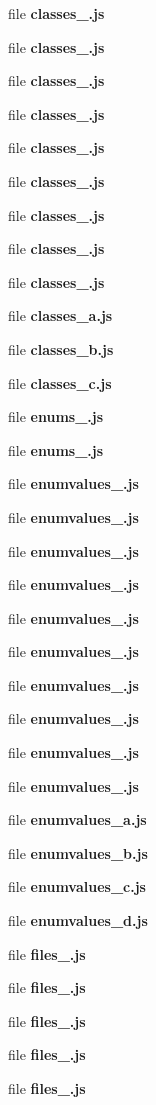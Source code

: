 \begin{DoxyCompactItemize}
file {\bf classes\-\_.\-js}
\item 
file {\bf classes\-\_.\-js}
\item 
file {\bf classes\-\_.\-js}
\item 
file {\bf classes\-\_.\-js}
\item 
file {\bf classes\-\_.\-js}
\item 
file {\bf classes\-\_.\-js}
\item 
file {\bf classes\-\_.\-js}
\item 
file {\bf classes\-\_.\-js}
\item 
file {\bf classes\-\_.\-js}
\item 
file {\bf classes\-\_\-a.\-js}
\item 
file {\bf classes\-\_\-b.\-js}
\item 
file {\bf classes\-\_\-c.\-js}
\item 
file {\bf enums\-\_.\-js}
\item 
file {\bf enums\-\_.\-js}
\item 
file {\bf enumvalues\-\_.\-js}
\item 
file {\bf enumvalues\-\_.\-js}
\item 
file {\bf enumvalues\-\_.\-js}
\item 
file {\bf enumvalues\-\_.\-js}
\item 
file {\bf enumvalues\-\_.\-js}
\item 
file {\bf enumvalues\-\_.\-js}
\item 
file {\bf enumvalues\-\_.\-js}
\item 
file {\bf enumvalues\-\_.\-js}
\item 
file {\bf enumvalues\-\_.\-js}
\item 
file {\bf enumvalues\-\_.\-js}
\item 
file {\bf enumvalues\-\_\-a.\-js}
\item 
file {\bf enumvalues\-\_\-b.\-js}
\item 
file {\bf enumvalues\-\_\-c.\-js}
\item 
file {\bf enumvalues\-\_\-d.\-js}
\item 
file {\bf files\-\_.\-js}
\item 
file {\bf files\-\_.\-js}
\item 
file {\bf files\-\_.\-js}
\item 
file {\bf files\-\_.\-js}
\item 
file {\bf files\-\_.\-js}
\item 

\end{DoxyCompactItemize}
